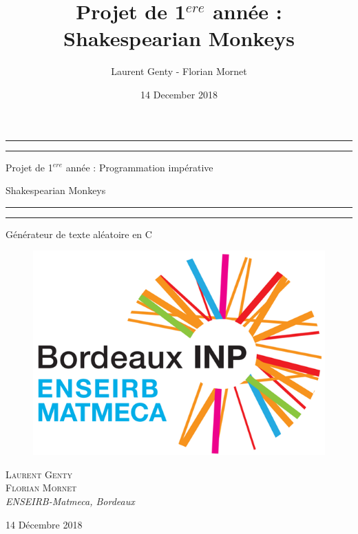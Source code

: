 \documentclass{article}
\title{Projet de 1$^{ere}$ année : Shakespearian Monkeys}
\author{Laurent Genty - Florian Mornet}
\date{14 December 2018}
\begin{document}
\begin{titlepage}

  \centering
  \scshape
  \vspace*{\baselineskip}
  \rule{\textwidth}{1.6pt}\vspace*{-\baselineskip}\vspace*{2pt}
  \rule{\textwidth}{0.4pt}
  \vspace{0.65\baselineskip}
  
  {\LARGE Projet de 1$^{ere}$ année : Programmation impérative}
    \vspace{0.60\baselineskip}
    
    {\LARGE Shakespearian Monkeys}
  \vspace{0.65\baselineskip}
  
  \rule{\textwidth}{0.4pt}\vspace*{-\baselineskip}\vspace{3.2pt}
  \rule{\textwidth}{1.6pt}
  \vspace{2\baselineskip}
  
  Générateur de texte aléatoire en C
  \vspace*{3\baselineskip}
  
  \begin{figure}[ht!]
    \centering
    \includegraphics[scale=0.3]{logo.PNG}
    \label{fig:logo}
    \end{figure}
  
  \vspace{0.5\baselineskip}
  {\scshape\Large Laurent Genty \\ Florian Mornet \\}
  \vspace{0.5\baselineskip}
  \textit{ENSEIRB-Matmeca, Bordeaux}
  \vfill
  \vspace{0.3\baselineskip}
  
  14 Décembre 2018
\end{titlepage}
\end{document}

